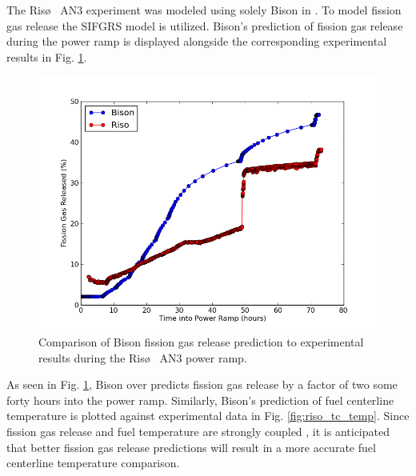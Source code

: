 The Ris\o~ AN3 experiment was modeled using solely Bison in \cite{Perez}. To model fission gas release the \ac{SIFGRS} model is utilized. Bison's prediction of fission gas release during the power ramp is displayed alongside the corresponding experimental results in Fig. \ref{fig:riso_fgr}.  
\begin{figure}
\caption{\label{fig:riso_fgr}
Comparison of Bison fission gas release prediction to experimental results during the Ris\o~ AN3 power ramp.}
 \begin{center}
  \includegraphics[scale=.75]{./Chapter4/fgr_comparison.png}
 \end{center}
\end{figure} 
As seen in Fig. \ref{fig:riso_fgr}, Bison over predicts fission gas release by a factor of two some forty hours into the power ramp. Similarly, Bison's prediction of fuel centerline temperature is plotted against experimental data in Fig. \ref{fig:riso_tc_temp}. Since fission gas release and fuel temperature are strongly coupled \cite{Perez}, it is anticipated that better fission gas release predictions will result in a more accurate fuel centerline temperature comparison. 

